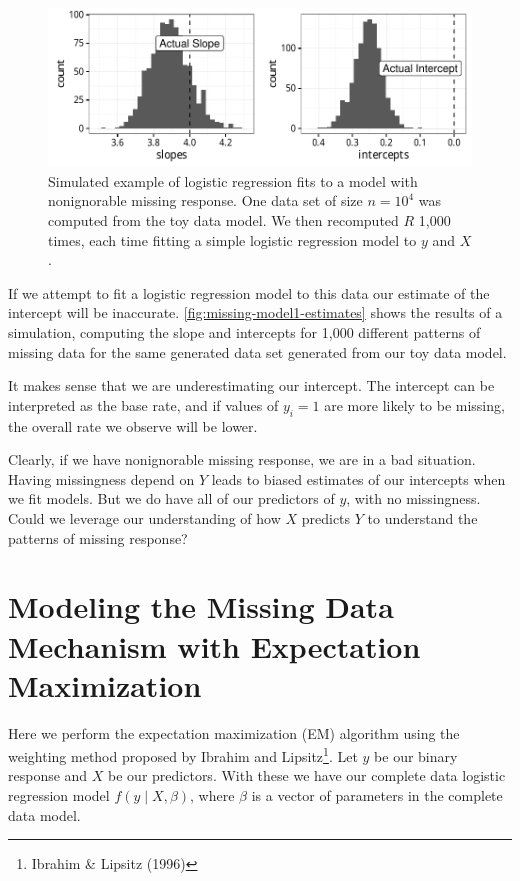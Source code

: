 \documentclass[12pt,twoside]{reedthesis}
\begin{document}
  \begin{figure}[htb]
  \centering
  \includegraphics{figure/missing_model1_estimates.pdf}
  \caption[Simulated example of biased estimates from nonignorable missing response]{Simulated example of logistic regression fits to a model with nonignorable
  missing response. One data set of size $n = 10^4$ was computed from the toy data model.
  We then recomputed $R$ 1,000 times, each time fitting a simple logistic regression
  model to $y$ and $X$. \label{fig:missing-model1-estimates}}
  \end{figure}
  
  If we attempt to fit a logistic regression model to this data our
  estimate of the intercept will be inaccurate.
  \autoref{fig:missing-model1-estimates} shows the results of a
  simulation, computing the slope and intercepts for 1,000 different
  patterns of missing data for the same generated data set generated from
  our toy data model.
  
  It makes sense that we are underestimating our intercept. The intercept
  can be interpreted as the base rate, and if values of \(y_i = 1\) are
  more likely to be missing, the overall rate we observe will be lower.
  
  Clearly, if we have nonignorable missing response, we are in a bad
  situation. Having missingness depend on \(Y\) leads to biased estimates
  of our intercepts when we fit models. But we do have all of our
  predictors of \(y\), with no missingness. Could we leverage our
  understanding of how \(X\) predicts \(Y\) to understand the patterns of
  missing response?
  
  \section{Modeling the Missing Data Mechanism with Expectation
  Maximization}\label{em-algorithm}
  
  Here we perform the expectation maximization (EM) algorithm using the
  weighting method proposed by Ibrahim and Lipsitz\footnote{Ibrahim \&
    Lipsitz (1996)}. Let \(y\) be our binary response and \(X\) be our
  predictors. With these we have our complete data logistic regression
  model \(f(y \;|\; X, \beta)\), where \(\beta\) is a vector of parameters
  in the complete data model.
  
\end{document}
